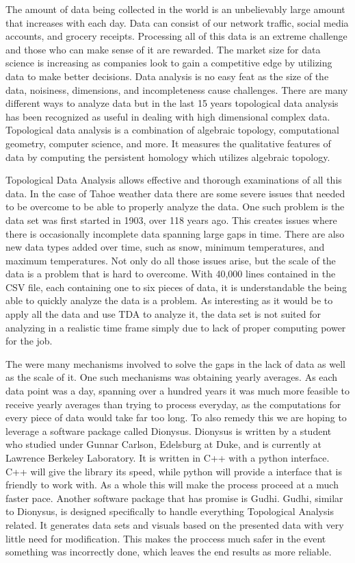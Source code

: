 \documentclass[12pt]{report}
\begin{document}
The amount of data being collected in the world is an unbelievably large amount that increases with each day. Data can consist of our network traffic, social media accounts, and grocery receipts. Processing all of this data is an extreme challenge and those who can make sense of it are rewarded. The market size for data science is increasing as companies look to gain a competitive edge by utilizing data to make better decisions. Data analysis is no easy feat as the size of the data, noisiness, dimensions, and incompleteness cause challenges. There are many different ways to analyze data but in the last 15 years topological data analysis has been recognized as useful in dealing with high dimensional complex data. Topological data analysis is a combination of algebraic topology, computational geometry, computer science, and more. It measures the qualitative features of data by computing the persistent homology which utilizes algebraic topology.
 
Topological Data Analysis allows effective and thorough examinations of all this data. In the case of Tahoe weather data there are some severe issues that needed to be overcome to be able to properly analyze the data. One such problem is the data set was first started in 1903, over 118 years ago. This creates issues where there is occasionally incomplete data spanning large gaps in time. There are also new data types added over time, such as snow, minimum temperatures, and maximum temperatures. Not only do all those issues arise, but the scale of the data is a problem that is hard to overcome. With 40,000 lines contained in the CSV file, each containing one to six pieces of data, it is understandable the being able to quickly analyze the data is a problem. As interesting as it would be to apply all the data and use TDA to analyze it, the data set is not suited for analyzing in a realistic time frame simply due to lack of proper computing power for the job.
    
The were many mechanisms involved to solve the gaps in the lack of data as well as the scale of it. One such mechanisms was obtaining yearly averages. As each data point was a day, spanning over a hundred years it was much more feasible to receive yearly averages than trying to process everyday, as the computations for every piece of data would take far too long. To also remedy this we are hoping to leverage a software package called Dionysus. Dionysus is written by a student who studied under Gunnar Carlson, Edelsburg at Duke, and is currently at Lawrence Berkeley Laboratory. It is written in C++ with a python interface. C++ will give the library its speed, while python will provide a interface that is friendly to work with. As a whole this will make the process proceed at a much faster pace. Another software package that has promise is Gudhi. Gudhi, similar to Dionysus, is designed specifically to handle everything Topological Analysis related. It generates data sets and visuals based on the presented data with very little need for modification. This makes the proccess much safer in the event something was incorrectly done, which leaves the end results as more reliable.
\end{document}
